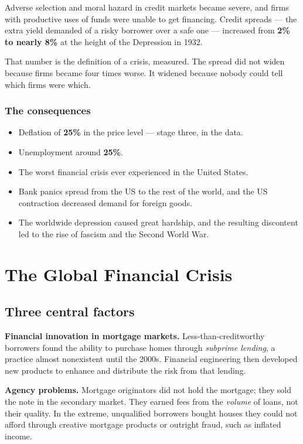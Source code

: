 \documentclass[11pt,a4paper]{article}
\begin{document}
Adverse selection and moral hazard in credit markets became severe, and firms
with productive uses of funds were unable to get financing. Credit spreads ---
the extra yield demanded of a risky borrower over a safe one --- increased from
\textbf{2\% to nearly 8\%} at the height of the Depression in 1932.

That number is the definition of a crisis, measured. The spread did not widen
because firms became four times worse. It widened because nobody could tell
which firms were which.

\subsubsection*{The consequences}
\begin{itemize}
\item Deflation of \textbf{25\%} in the price level --- stage three, in the data.
\item Unemployment around \textbf{25\%}.
\item The worst financial crisis ever experienced in the United States.
\item Bank panics spread from the US to the rest of the world, and the US
contraction decreased demand for foreign goods.
\item The worldwide depression caused great hardship, and the resulting
discontent led to the rise of fascism and the Second World War.
\end{itemize}

\section{The Global Financial Crisis}

\subsection*{Three central factors}

\textbf{Financial innovation in mortgage markets.} Less-than-creditworthy
borrowers found the ability to purchase homes through \emph{subprime lending}, a
practice almost nonexistent until the 2000s. Financial engineering then
developed new products to enhance and distribute the risk from that lending.

\textbf{Agency problems.} Mortgage originators did not hold the mortgage; they
sold the note in the secondary market. They earned fees from the \emph{volume}
of loans, not their quality. In the extreme, unqualified borrowers bought houses
they could not afford through creative mortgage products or outright fraud, such
as inflated income.
\end{document}
